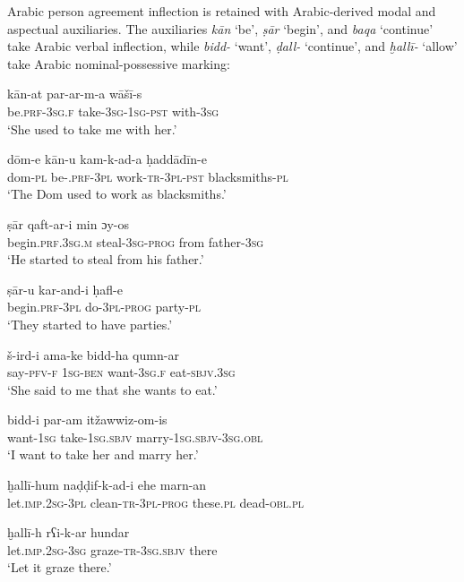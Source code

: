 \documentclass[output=paper]{langsci/langscibook}
\begin{document}
Arabic person agreement inflection is retained with Arabic-derived modal and aspectual auxiliaries. The auxiliaries \textit{kān} ‘be’, \textit{ṣār} ‘begin’, and \textit{baqa} ‘continue’ take Arabic verbal inflection, while \textit{bidd-} ‘want’, \textit{ḍall-} ‘continue’, and \textit{ḫallī-} ‘allow’ take Arabic nominal-possessive marking:

\ea
\ea
\gll kān-at           par-ar-m-a        wāšī-s  \\
     be.\textsc{prf-3sg.f}   take-\textsc{3sg-1sg-pst}  with-\textsc{3sg}\\
\glt ‘She used to take me with her.’

\ex
\gll dōm-e kān-u kam-k-ad-a  {ḥ}addādīn-e\\
     dom-\textsc{pl} be-\textsc{.prf-3pl} work-\textsc{tr-3pl-pst} blacksmiths-\textsc{pl}\\
\glt ‘The Dom used to work as blacksmiths.’
\z
\z

\ea
\ea
\gll ṣār  qaft-ar-i  min  {ɔ}y-os\\
     begin.\textsc{prf.3sg.m} steal-\textsc{3sg-prog} from father-\textsc{3sg}\\
\glt ‘He started to steal from his father.’

\ex
\gll ṣār-u  kar-and-i  ḥafl-e\\
     begin.\textsc{prf-3pl} do-\textsc{3pl}-\textsc{prog}  party-\textsc{pl}\\
\glt ‘They started to have parties.’
\z
\z

\ea
\ea
\gll š-ird-i  ama-ke bidd-ha qumn-ar\\
     say-\textsc{pfv-f} \textsc{1sg-ben} want-\textsc{3sg.f} eat-\textsc{sbjv.3sg}\\
\glt ‘She said to me that she wants to eat.’

\ex
\gll bidd-i  par-am itžawwiz-om-is\\
     want-\textsc{1sg} take-\textsc{1sg.sbjv} marry-\textsc{1sg.sbjv-3sg.obl}\\
\glt ‘I want to take her and marry her.’
\z
\z

\ea
\ea
\gll ḫallī-hum naḍḍif-k-ad-i ehe marn-an  \\
     let.\textsc{imp.2sg-3pl} clean-\textsc{tr-3pl-prog} these.\textsc{pl} dead-\textsc{obl.pl}\\
 \label{xalli}

\ex
\gll ḫallī-h rʕi-k-ar hundar\\
     let.\textsc{imp.2sg}-\textsc{3sg} graze-\textsc{tr-3sg.sbjv} there\\
\glt ‘Let it graze there.’
\z
\z
\end{document}
